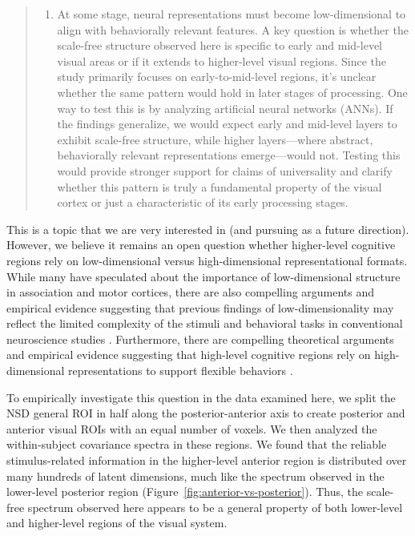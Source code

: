 \documentclass[10pt]{article}
\providecommand{\tightlist}{\setlength{\itemsep}{0pt}\setlength{\parskip}{0pt}}
\begin{document}
\begin{quote}
\begin{enumerate}
\def\labelenumi{\arabic{enumi}.}
\setcounter{enumi}{1}
\tightlist
\item
  At some stage, neural representations must become low-dimensional to align with behaviorally relevant features. A key question is whether the scale-free structure observed here is specific to early and mid-level visual areas or if it extends to higher-level visual regions. Since the study primarily focuses on early-to-mid-level regions, it's unclear whether the same pattern would hold in later stages of processing. One way to test this is by analyzing artificial neural networks (ANNs). If the findings generalize, we would expect early and mid-level layers to exhibit scale-free structure, while higher layers---where abstract, behaviorally relevant representations emerge---would not. Testing this would provide stronger support for claims of universality and clarify whether this pattern is truly a fundamental property of the visual cortex or just a characteristic of its early processing stages.
\end{enumerate}
\end{quote}

This is a topic that we are very interested in (and pursuing as a future direction). However, we believe it remains an open question whether higher-level cognitive regions rely on low-dimensional versus high-dimensional representational formats. While many have speculated about the importance of low-dimensional structure in association and motor cortices, there are also compelling arguments and empirical evidence suggesting that previous findings of low-dimensionality may reflect the limited complexity of the stimuli and behavioral tasks in conventional neuroscience studies \autocite{Yan2020,Sorscher2022}. Furthermore, there are compelling theoretical arguments and empirical evidence suggesting that high-level cognitive regions rely on high-dimensional representations to support flexible behaviors \autocite{Rigotti2013,Fusi2016,Posani2024}.

To empirically investigate this question in the data examined here, we split the NSD general ROI in half along the posterior-anterior axis to create posterior and anterior visual ROIs with an equal number of voxels. We then analyzed the within-subject covariance spectra in these regions. We found that the reliable stimulus-related information in the higher-level anterior region is distributed over many hundreds of latent dimensions, much like the spectrum observed in the lower-level posterior region (Figure~\ref{fig:anterior-vs-posterior}). Thus, the scale-free spectrum observed here appears to be a general property of both lower-level and higher-level regions of the visual system.
\end{document}
